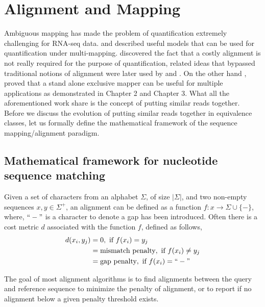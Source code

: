 





\section{Alignment and Mapping}
Ambiguous mapping has made the problem of quantification extremely challenging for RNA-seq data. \citet{salzman2011statistical} and \citet{pachter2011models} described useful models that can be used for quantification under multi-mapping. \citet{sailfish} discovered the fact that a costly alignment is not really required for the purpose of quantification, related ideas that bypassed traditional notions of alignment were later used by \citet{kallisto} and \citet{salmon}. On the other hand \citet{rapmap},  proved that a stand alone exclusive mapper can be useful for multiple applications as demonstrated in Chapter 2 and Chapter 3. What all the aforementioned work share is the concept of putting similar reads together. Before we discuss the evolution of putting similar reads together in equivalence classes, let us formally define the mathematical framework of the sequence mapping/alignment paradigm. 

\subsection{Mathematical framework for nucleotide sequence matching}
Given a set of characters from an alphabet $\Sigma$, of size $|\Sigma|$, and two non-empty sequences $x,y \in \Sigma^+$, an alignment can be defined as a function $f : x \rightarrow \Sigma \cup \{-\}$, where, $``-"$ is a character to denote a gap has been introduced. Often there is a cost metric $d$ associated with the function $f$, defined as follows, 
\begin{align}
    d(x_i,y_j) &= 0,\text{ if } f(x_i) = y_j \\
    &= \text{mismatch penalty},\text{ if } f(x_i) \neq y_j \\
    &= \text{gap penalty},\text{ if } f(x_i) = ``-" 
\end{align}



The goal of most alignment algorithms \citep{Li2010} is to find alignments between the query and reference sequence to minimize the penalty of alignment, or to report if no alignment below a given penalty threshold exists. 

